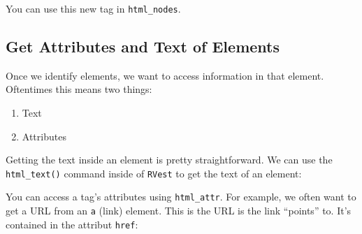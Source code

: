 \documentclass[]{book}
\newenvironment{Shaded}{\begin{snugshade}}{\end{snugshade}}
\newcommand{\KeywordTok}[1]{\textcolor[rgb]{0.13,0.29,0.53}{\textbf{#1}}}
\newcommand{\StringTok}[1]{\textcolor[rgb]{0.31,0.60,0.02}{#1}}
\newcommand{\CommentTok}[1]{\textcolor[rgb]{0.56,0.35,0.01}{\textit{#1}}}
\newcommand{\OperatorTok}[1]{\textcolor[rgb]{0.81,0.36,0.00}{\textbf{#1}}}
\newcommand{\NormalTok}[1]{#1}
\providecommand{\tightlist}{%
  \setlength{\itemsep}{0pt}\setlength{\parskip}{0pt}}
\begin{document}
You can use this new tag in \texttt{html\_nodes}.

\subsection{Get Attributes and Text of
Elements}\label{get-attributes-and-text-of-elements}

Once we identify elements, we want to access information in that
element. Oftentimes this means two things:

\begin{enumerate}
\def\labelenumi{\arabic{enumi})}
\tightlist
\item
  Text
\item
  Attributes
\end{enumerate}

Getting the text inside an element is pretty straightforward. We can use
the \texttt{html\_text()} command inside of \texttt{RVest} to get the
text of an element:

\begin{Shaded}
\end{Shaded}

You can access a tag's attributes using \texttt{html\_attr}. For
example, we often want to get a URL from an \texttt{a} (link) element.
This is the URL is the link ``points'' to. It's contained in the
attribut \texttt{href}:

\begin{Shaded}
\end{Shaded}
\end{document}
